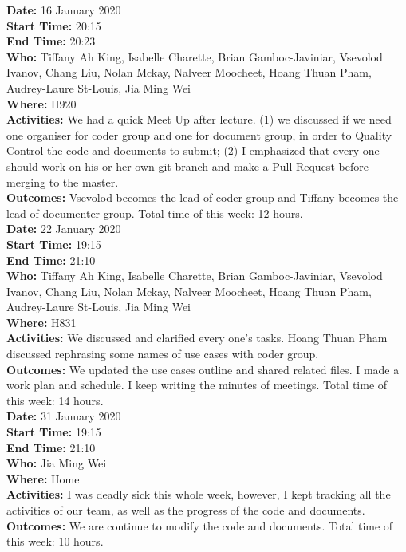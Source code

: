 \documentclass[12pt]{article}
\begin{document}
{\bf Date:} 16 January 2020\\
{\bf Start Time:} 20:15\\
{\bf End Time:}  20:23\\
{\bf Who:} Tiffany Ah King,
Isabelle Charette,
Brian Gamboc-Javiniar,
Vsevolod Ivanov,
Chang Liu,
Nolan Mckay,
Nalveer Moocheet,
Hoang Thuan Pham,
Audrey-Laure St-Louis,
Jia Ming Wei\\
{\bf Where:} H920 \\
{\bf Activities:} We had a quick Meet Up after lecture. (1) we discussed if we need one organiser for coder group and one for document group, in order to Quality Control the code and documents to submit; (2) I emphasized that every one should work on his or her own git branch and make a Pull Request before merging to the master.\\
{\bf Outcomes:} Vsevolod becomes the lead of coder group and Tiffany becomes the lead of documenter group. Total time of this week: 12 hours.\\

{\bf Date:} 22 January 2020\\
{\bf Start Time:} 19:15\\
{\bf End Time:}  21:10\\
{\bf Who:} Tiffany Ah King,
Isabelle Charette,
Brian Gamboc-Javiniar,
Vsevolod Ivanov,
Chang Liu,
Nolan Mckay,
Nalveer Moocheet,
Hoang Thuan Pham,
Audrey-Laure St-Louis,
Jia Ming Wei\\
{\bf Where:} H831 \\
{\bf Activities:}  We discussed and clarified every one's tasks. Hoang Thuan Pham discussed rephrasing some names of use cases with coder group.  \\
{\bf Outcomes:} We updated the use cases outline and shared related files. I made a work plan and schedule. I keep writing the minutes of meetings. Total time of this week: 14 hours.\\

{\bf Date:} 31 January 2020\\
{\bf Start Time:} 19:15\\
{\bf End Time:}  21:10\\
{\bf Who:} 
Jia Ming Wei\\
{\bf Where:} Home\\
{\bf Activities:}  I was deadly sick this whole week, however, I kept tracking all the activities of our team, as well as the progress of the code and documents.  \\
{\bf Outcomes:} We are continue to modify the code and documents. Total time of this week: 10 hours.\\
\end{document}
